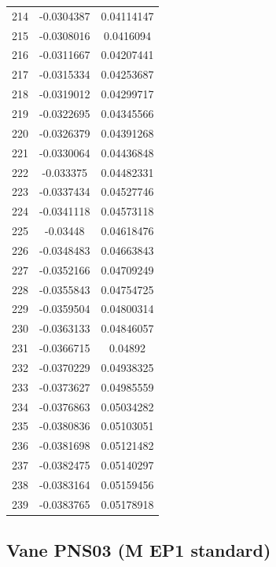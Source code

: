 \documentclass[a4paper, 11pt, oneside]{report}
\begin{document}
{\begin{longtable}{|c|c|c|}
214 & -0.0304387 & 0.04114147 \\
215 & -0.0308016 & 0.0416094  \\
216 & -0.0311667 & 0.04207441 \\
217 & -0.0315334 & 0.04253687 \\
218 & -0.0319012 & 0.04299717 \\
219 & -0.0322695 & 0.04345566 \\
220 & -0.0326379 & 0.04391268 \\
221 & -0.0330064 & 0.04436848 \\
222 & -0.033375  & 0.04482331 \\
223 & -0.0337434 & 0.04527746 \\
224 & -0.0341118 & 0.04573118 \\
225 & -0.03448   & 0.04618476 \\
226 & -0.0348483 & 0.04663843 \\
227 & -0.0352166 & 0.04709249 \\
228 & -0.0355843 & 0.04754725 \\
229 & -0.0359504 & 0.04800314 \\
230 & -0.0363133 & 0.04846057 \\
231 & -0.0366715 & 0.04892    \\
232 & -0.0370229 & 0.04938325 \\
233 & -0.0373627 & 0.04985559 \\
234 & -0.0376863 & 0.05034282 \\
235 & -0.0380836 & 0.05103051 \\
236 & -0.0381698 & 0.05121482 \\
237 & -0.0382475 & 0.05140297 \\
238 & -0.0383164 & 0.05159456 \\
239 & -0.0383765 & 0.05178918 \\
\hline
\end{longtable}
\unskip
\unpenalty
\unpenalty}

\begin{multicols}{2}
\unvbox\ltmcbox
\end{multicols}

\subsection{Vane PNS03 (M EP1 standard)}
\end{document}

